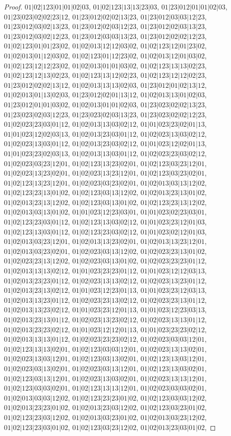 \documentclass[12pt]{article}
\theoremstyle{plain}
\theoremstyle{definition}
\theoremstyle{remark}
\begin{document}
\begin{proof}
$01|02|123|01|01|02|03$, $01|02|123|13|13|23|03$, $01|23|012|01|01|02|03$, $01|23|023|02|02|23|12$, $01|23|012|02|02|13|23$, $01|23|012|03|03|12|23$, $01|23|012|03|02|13|23$, $01|23|012|02|03|12|23$, $01|23|012|02|03|13|23$, $01|23|012|03|02|12|23$, $01|23|012|03|03|13|23$, $01|23|012|02|02|12|23$, $01|02|123|01|01|23|02$, $01|02|013|12|12|03|02$, $01|02|123|12|01|23|02$, $01|02|013|01|12|03|02$, $01|02|123|01|12|23|02$, $01|02|013|12|01|03|02$, $01|02|123|12|12|23|02$, $01|02|013|01|01|03|02$, $01|02|123|13|13|02|23$, $01|02|123|12|13|02|23$, $01|02|123|13|12|02|23$, $01|02|123|12|12|02|23$, $01|23|012|02|02|13|12$, $01|02|013|13|13|02|03$, $01|23|012|01|02|13|12$, $01|02|013|01|13|02|03$, $01|23|012|02|01|13|12$, $01|02|013|13|01|02|03$, $01|23|012|01|01|03|02$, $01|02|013|01|01|02|03$, $01|23|023|02|02|13|23$, $01|23|023|02|03|12|23$, $01|23|023|02|03|13|23$, $01|23|023|02|02|12|23$, $01|02|023|23|03|01|12$, $01|02|013|13|03|02|12$, $01|01|023|23|02|01|13$, $01|01|023|12|02|03|13$, $01|02|013|23|03|01|12$, $01|02|023|13|03|02|12$, $01|02|023|13|03|01|12$, $01|02|013|23|03|02|12$, $01|01|023|12|02|01|13$, $01|01|023|23|02|03|13$, $01|02|013|13|03|01|12$, $01|02|023|23|03|02|12$, $01|02|023|03|23|12|01$, $01|02|123|13|23|02|01$, $01|02|123|03|23|12|01$, $01|02|023|13|23|02|01$, $01|02|023|13|23|12|01$, $01|02|123|03|23|02|01$, $01|02|123|13|23|12|01$, $01|02|023|03|23|02|01$, $01|02|013|03|13|12|02$, $01|02|123|23|13|01|02$, $01|02|123|03|13|12|02$, $01|02|013|23|13|01|02$, $01|02|013|23|13|12|02$, $01|02|123|03|13|01|02$, $01|02|123|23|13|12|02$, $01|02|013|03|13|01|02$, $01|01|023|12|23|03|01$, $01|01|023|02|23|03|01$, $01|02|123|23|03|01|12$, $01|02|123|13|03|02|12$, $01|01|023|23|12|01|03$, $01|02|123|13|03|01|12$, $01|02|123|23|03|02|12$, $01|01|023|02|12|01|03$, $01|02|013|03|23|12|01$, $01|02|013|13|23|02|01$, $01|02|013|13|23|12|01$, $01|02|013|03|23|02|01$, $01|02|023|03|13|12|02$, $01|02|023|23|13|01|02$, $01|02|023|23|13|12|02$, $01|02|023|03|13|01|02$, $01|02|023|23|23|01|12$, $01|02|013|13|13|02|12$, $01|01|023|23|23|01|12$, $01|01|023|12|12|03|13$, $01|02|013|23|23|01|12$, $01|02|023|13|13|02|12$, $01|02|023|13|23|01|12$, $01|02|013|23|13|02|12$, $01|01|023|12|23|01|13$, $01|01|023|23|12|03|13$, $01|02|013|13|23|01|12$, $01|02|023|23|13|02|12$, $01|02|023|23|13|01|12$, $01|02|013|13|23|02|12$, $01|01|023|23|12|01|13$, $01|01|023|12|23|03|13$, $01|02|013|23|13|01|12$, $01|02|023|13|23|02|12$, $01|02|023|13|13|01|12$, $01|02|013|23|23|02|12$, $01|01|023|12|12|01|13$, $01|01|023|23|23|02|12$, $01|02|013|13|13|01|12$, $01|02|023|23|23|02|12$, $01|02|023|03|03|12|01$, $01|02|123|13|13|02|01$, $01|02|123|03|03|12|01$, $01|02|023|13|13|02|01$, $01|02|023|13|03|12|01$, $01|02|123|03|13|02|01$, $01|02|123|13|03|12|01$, $01|02|023|03|13|02|01$, $01|02|023|03|13|12|01$, $01|02|123|13|03|02|01$, $01|02|123|03|13|12|01$, $01|02|023|13|03|02|01$, $01|02|023|13|13|12|01$, $01|02|123|03|03|02|01$, $01|02|123|13|13|12|01$, $01|02|023|03|03|02|01$, $01|02|013|03|03|12|02$, $01|02|123|23|23|01|02$, $01|02|123|03|03|12|02$, $01|02|013|23|23|01|02$, $01|02|013|23|03|12|02$, $01|02|123|03|23|01|02$, $01|02|123|23|03|12|02$, $01|02|013|03|23|01|02$, $01|02|013|03|23|12|02$, $01|02|123|23|03|01|02$, $01|02|123|03|23|12|02$, $01|02|013|23|03|01|02$, 
\end{proof}
\end{document}
